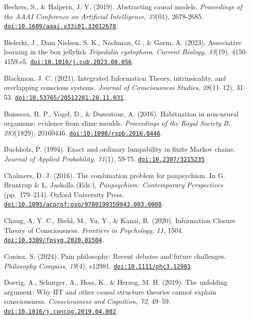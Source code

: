 \documentclass[
  11pt,
  a4paper,
]{article}
\begin{document}
Beckers, S., \& Halpern, J. Y. (2019). Abstracting causal models.
\emph{Proceedings of the AAAI Conference on Artificial Intelligence,
33}(01), 2678-2685.
\href{https://doi.org/10.1609/aaai.v33i01.33012678}{\nolinkurl{doi:10.1609/aaai.v33i01.33012678}}.

Bielecki, J., Dam Nielsen, S. K., Nachman, G., \& Garm, A. (2023).
Associative learning in the box jellyfish \emph{Tripedalia cystophora}.
\emph{Current Biology, 33}(19), 4150--4159.e5.
\href{https://doi.org/10.1016/j.cub.2023.08.056}{\nolinkurl{doi:10.1016/j.cub.2023.08.056}}.

Blackmon, J. C. (2021). Integrated Information Theory, intrinsicality,
and overlapping conscious systems. \emph{Journal of Consciousness
Studies, 28}(11--12), 31--53.
\href{https://doi.org/10.53765/20512201.28.11.031}{\nolinkurl{doi:10.53765/20512201.28.11.031}}.

Boisseau, R. P., Vogel, D., \& Dussutour, A. (2016). Habituation in
non-neural organisms: evidence from slime moulds. \emph{Proceedings of
the Royal Society B, 283}(1829), 20160446.
\href{https://doi.org/10.1098/rspb.2016.0446}{\nolinkurl{doi:10.1098/rspb.2016.0446}}.

Buchholz, P. (1994). Exact and ordinary lumpability in finite Markov
chains. \emph{Journal of Applied Probability, 31}(1), 59-75.
\href{https://doi.org/10.2307/3215235}{\nolinkurl{doi:10.2307/3215235}}.

Chalmers, D. J. (2016). The combination problem for panpsychism. In G.
Bruntrup \& L. Jaskolla (Eds.), \emph{Panpsychism: Contemporary
Perspectives} (pp.~179--214). Oxford University Press.
\href{https://doi.org/10.1093/acprof:oso/9780199359943.003.0008}{\nolinkurl{doi:10.1093/acprof:oso/9780199359943.003.0008}}.

Chang, A. Y. C., Biehl, M., Yu, Y., \& Kanai, R. (2020). Information
Closure Theory of Consciousness. \emph{Frontiers in Psychology, 11},
1504.
\href{https://doi.org/10.3389/fpsyg.2020.01504}{\nolinkurl{doi:10.3389/fpsyg.2020.01504}}.

Coninx, S. (2024). Pain philosophy: Recent debates and future
challenges. \emph{Philosophy Compass, 19}(4), e12981.
\href{https://doi.org/10.1111/phc3.12981}{\nolinkurl{doi:10.1111/phc3.12981}}.

Doerig, A., Schurger, A., Hess, K., \& Herzog, M. H. (2019). The
unfolding argument: Why IIT and other causal structure theories cannot
explain consciousness. \emph{Consciousness and Cognition, 72}, 49--59.
\href{https://doi.org/10.1016/j.concog.2019.04.002}{\nolinkurl{doi:10.1016/j.concog.2019.04.002}}.
\end{document}
